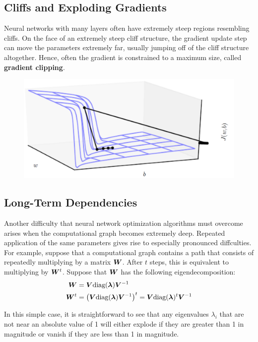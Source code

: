 \begin{multicols}{2}
	\subsection{Cliffs and Exploding Gradients}
	Neural networks with many layers often have extremely steep regions resembling cliffs.
	On the face of an extremely steep cliff structure, the gradient update step can move the parameters extremely far, usually jumping off of the cliff structure altogether.
	Hence, often the gradient is constrained to a maximum size, called \textbf{gradient clipping}.
	\begin{figure}[H]
		\centering
		\includegraphics[width=0.9\linewidth]{images/cliff.png}
	\end{figure}


	\subsection{Long-Term Dependencies}
	Another difficulty that neural network optimization algorithms must overcome arises when the computational graph becomes extremely deep.
	Repeated application of the same parameters gives rise to especially pronounced diffculties.
	For example, suppose that a computational graph contains a path that consists of repeatedly multiplying by a matrix ${\bm{W}}$.
	After $t$ steps, this is equivalent to multiplying by ${\bm{W}}^t$.
	Suppose that ${\bm{W}}$ has the following eigendecomposition:
	\begin{align*}
	\mW &= \mV \diag(\bol{\lambda})\mV^{-1}\\
	\mW^t &= \left(\mV \diag(\bol{\lambda})\mV^{-1}\right)^t = \mV \diag(\bol{\lambda})^t\mV^{-1}
 	\end{align*}


	In this simple case, it is straightforward to see that any eigenvalues $\lambda_i$ that are not near an absolute value of 1 will either explode if they are greater than 1 in magnitude or vanish if they are less than 1 in magnitude.\\


\end{multicols}
